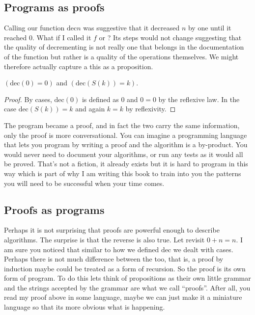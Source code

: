 \subsection{Programs as proofs}
Calling our function $\text{dec}{n}$ was suggestive that 
it decreased $n$ by one until it reached $0$.  What if I called 
it $f$ or ? Its steps would not change suggesting that 
the quality of decrementing is not really one that belongs in 
the documentation of the function but rather is a quality of the 
operations themselves.  We might therefore actually capture a 
this as a proposition.
\begin{proposition}
    $(\text{dec}(0)=0)$ and $(\text{dec}(S(k))=k)$.
\end{proposition}
\begin{proof}
    By cases, $\text{dec}(0)$ is defined as $0$ and $0=0$ by 
    the reflexive law.  In the case $\text{dec}(S(k))=k$ 
    and again $k=k$ by reflexivity.
\end{proof}
The program became a proof, and in fact the two carry the 
same information, only the proof is more conversational.
You can imagine a programming language that lets you program 
by writing a proof and the algorithm is a by-product.  You would 
never need to document your algorithms, or run any tests as 
it would all be proved.  That's not a fiction, it already exists
but it is hard to program in this way which is part of why I am 
writing this book to train into you the patterns you will need 
to be successful when your time comes.


\subsection{Proofs as programs}
Perhaps it is not surprising that proofs are powerful enough to 
describe algorithms.  The surprise is that the reverse is also true.
Let revisit $0+n=n$.  I am sure you noticed that similar to how 
we defined $\text{dec}$ we dealt with cases.  
Perhaps there is not much difference between the too, that is, 
a proof by induction maybe could be treated as a form of recursion. So the 
proof is its own form of program.  To do this lets think of 
propositions as their own little grammar and the strings accepted 
by the grammar are what we call ``proofs''.   After all, you read 
my proof above in some language, maybe we can just make it a 
miniature language so that its more obvious what is happening. 

